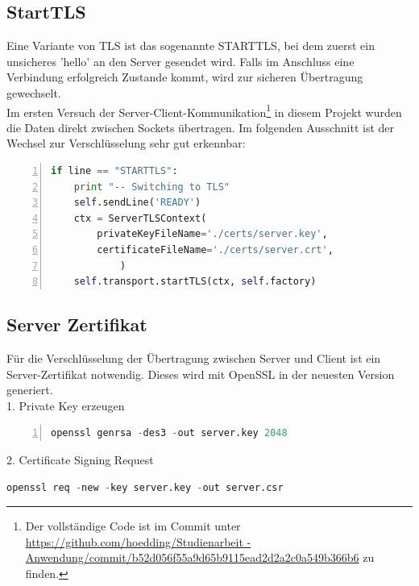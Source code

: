 \subsection{StartTLS}
Eine Variante von TLS ist das sogenannte STARTTLS, bei dem zuerst ein unsicheres 'hello' an den Server gesendet wird. Falls im Anschluss eine Verbindung erfolgreich Zustande kommt, wird zur sicheren Übertragung gewechselt. \\
Im ersten Versuch der Server-Client-Kommunikation\footnote{Der vollständige Code ist im Commit unter \url{https://github.com/hoedding/Studienarbeit -Anwendung/commit/b52d056f55a9d65b9115ead2d2a2c0a549b366b6} zu finden.} in diesem Projekt wurden die Daten direkt zwischen Sockets übertragen. Im folgenden Ausschnitt ist der Wechsel zur Verschlüsselung sehr gut erkennbar\cite{twisted-server}: 
\begin{lstlisting}[caption = Starttls - Wechsel zur Verschlüsselung, language=python, frame=single, breaklines=true,columns=fullflexible, commentstyle=\color{gray}\upshape, captionpos=b, numbers = left]
if line == "STARTTLS":
	print "-- Switching to TLS"
	self.sendLine('READY')
	ctx = ServerTLSContext(
		privateKeyFileName='./certs/server.key',
		certificateFileName='./certs/server.crt',
			)
	self.transport.startTLS(ctx, self.factory)
\end{lstlisting}


\subsection{Server Zertifikat}
Für die Verschlüsselung der Übertragung zwischen Server und Client ist ein Server-Zertifikat notwendig. Dieses wird mit OpenSSL\cite{openssl} in der neuesten Version generiert. \\
1. Private Key erzeugen
\begin{lstlisting}[caption =private Key, language=python, frame=single, breaklines=true,columns=fullflexible, commentstyle=\color{gray}\upshape, captionpos=b, numbers = left]
openssl genrsa -des3 -out server.key 2048
\end{lstlisting}

2. Certificate Signing Request
\begin{lstlisting}[caption =Certificate Signing Request, language=python, frame=single, breaklines=true,columns=fullflexible, commentstyle=\color{gray}\upshape, captionpos=b]
openssl req -new -key server.key -out server.csr
\end{lstlisting}


